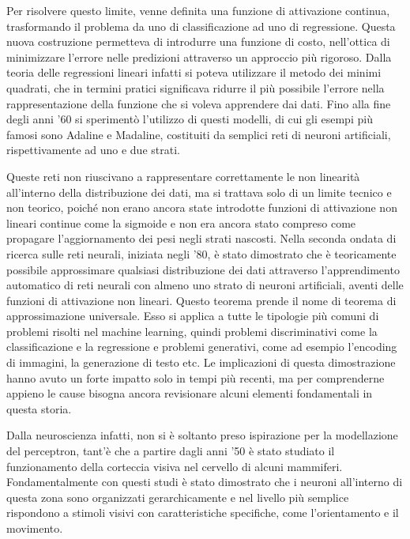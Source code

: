 \noindent Per risolvere questo limite, venne definita una funzione di attivazione continua, trasformando il problema da uno di classificazione ad uno di regressione. Questa nuova costruzione permetteva di introdurre una funzione di costo, nell'ottica di minimizzare l'errore nelle predizioni attraverso un approccio più rigoroso. Dalla teoria delle regressioni lineari infatti si poteva utilizzare il metodo dei minimi quadrati, che in termini pratici significava ridurre il più possibile l'errore nella rappresentazione della funzione che si voleva apprendere dai dati. Fino alla fine degli anni '60 si sperimentò l'utilizzo di questi modelli, di cui gli esempi più famosi sono Adaline e Madaline, costituiti da semplici reti di neuroni artificiali, rispettivamente ad uno e due strati. 

Queste reti non riuscivano a rappresentare correttamente le non linearità all'interno della distribuzione dei dati, ma si trattava solo di un limite tecnico e non teorico, poiché non erano ancora state introdotte funzioni di attivazione non lineari continue come la sigmoide e non era ancora stato compreso come propagare l'aggiornamento dei pesi negli strati nascosti. Nella seconda ondata di ricerca sulle reti neurali, iniziata negli '80, è stato dimostrato che è teoricamente possibile approssimare qualsiasi distribuzione dei dati attraverso l'apprendimento automatico di reti neurali con almeno uno strato di neuroni artificiali, aventi delle funzioni di attivazione non lineari. Questo teorema prende il nome di teorema di approssimazione universale. Esso si applica a tutte le tipologie più comuni di problemi risolti nel machine learning, quindi problemi discriminativi come la classificazione e la regressione e problemi generativi, come ad esempio l'encoding di immagini, la generazione di testo etc. Le implicazioni di questa dimostrazione hanno avuto un forte impatto solo in tempi più recenti, ma per comprenderne appieno le cause bisogna ancora revisionare alcuni elementi fondamentali in questa storia.


Dalla neuroscienza infatti, non si è soltanto preso ispirazione per la modellazione del perceptron, tant'è che a partire dagli anni '50 è stato studiato il funzionamento della corteccia visiva nel cervello di alcuni mammiferi. Fondamentalmente con questi studi è stato dimostrato che i neuroni all'interno di questa zona sono organizzati gerarchicamente e nel livello più semplice rispondono a stimoli visivi con caratteristiche specifiche, come l'orientamento e il movimento. 

